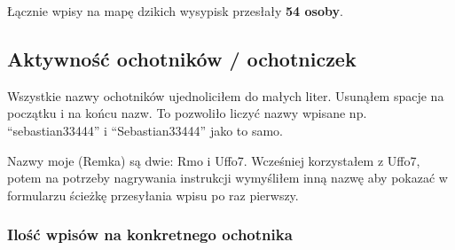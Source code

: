 \documentclass[
]{article}
\begin{document}
Łącznie wpisy na mapę dzikich wysypisk przesłały \textbf{54 osoby}.

\hypertarget{aktywnoux15bux107-ochotnikuxf3w-ochotniczek}{%
\subsection{Aktywność ochotników /
ochotniczek}\label{aktywnoux15bux107-ochotnikuxf3w-ochotniczek}}

Wszystkie nazwy ochotników ujednoliciłem do małych liter. Usunąłem
spacje na początku i na końcu nazw. To pozwoliło liczyć nazwy wpisane
np. ``sebastian33444'' i ``Sebastian33444'' jako to samo.

Nazwy moje (Remka) są dwie: Rmo i Uffo7. Wcześniej korzystałem z Uffo7,
potem na potrzeby nagrywania instrukcji wymyśliłem inną nazwę aby
pokazać w formularzu ścieżkę przesyłania wpisu po raz pierwszy.

\hypertarget{iloux15bux107-wpisuxf3w-na-konkretnego-ochotnika}{%
\subsubsection{Ilość wpisów na konkretnego
ochotnika}\label{iloux15bux107-wpisuxf3w-na-konkretnego-ochotnika}}
\end{document}
